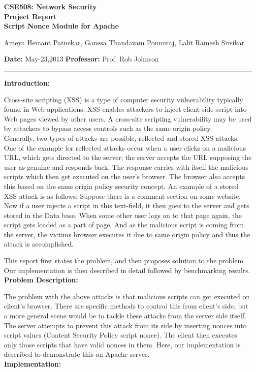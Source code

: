 \documentclass{article}
\newcommand{\headings}[2]{
\begin{center}
\bf CSE508: Network Security		\\
\bf Project Report					\\
\bf Script Nonce Module for Apache	\\
\end{center}
{\centerline{ { Ameya Hemant Patnekar, Ganesa Thandavam Ponnuraj, Lalit Ramesh Sirsikar } } }
{{\bf Date:} #2} \hfill {{\bf Professor:} #1} \\
\rule[0.1in]{\textwidth}{0.020in}
}
\begin{document}
\headings{Prof. Rob Johnson}{May-23,2013}

\noindent
\textbf{Introduction:} 
\medskip

Cross-site scripting (XSS) is a type of computer security vulnerability typically found in Web applications. XSS enables attackers to inject client-side script into Web pages viewed by other users. A cross-site scripting vulnerability may be used by attackers to bypass access controls such as the same origin policy.
\\
\indent
Generally, two types of attacks are possible, reflected and stored XSS attacks. One of the example for reflected attacks occur when a user clicks on a malicious URL, which gets directed to the server; the server accepts the URL supposing the user as genuine and responds back. The response carries with itself the malicious scripts which then get executed on the user's browser. The browser also accepts this based on the same origin policy security concept.
An example of a stored XSS attack is as follows: Suppose there is a comment section on some website. Now if a user injects a script in this text-field, it then goes to the server and gets stored in the Data base. When some other user logs on to that page again, the script gets loaded as a part of page. And as the malicious script is coming from the server, the victims browser executes it due to same origin policy and thus the attack is accomplished.

This report first states the problem, and then proposes solution to the problem. Our implementation is then described in detail followed by benchmarking results.
\\

\noindent
\textbf{Problem Description:} 
\medskip

The problem with the above attacks is that malicious scripts can get executed on client's browser. There are specific methods to control this from client's side, but a more general scene would be to tackle these attacks from the server side itself. The server attempts to prevent this attack from its side by inserting nonces into script values (Content Security Policy script nonce). The client then executes only those scripts that have valid nonces in them. Here, our implementation is described to demonstrate this on Apache server.
\\%

\noindent
\textbf{Implementation:} 
\medskip
\end{document}
